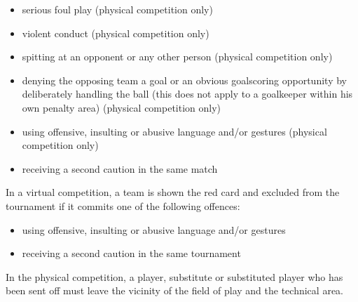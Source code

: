 \begin{itemize}
\item serious foul play (physical competition only)
\item violent conduct (physical competition only)
\item spitting at an opponent or any other person (physical competition only)
\item denying the opposing team a goal or an obvious goalscoring opportunity by deliberately handling the ball (this does not apply to a goalkeeper within his own penalty area) (physical competition only)
\item using offensive, insulting or abusive language and/or gestures (physical competition only)
\item receiving a second caution in the same match
\end{itemize}

\bigskip

In a virtual competition, a team is shown the red card and excluded from the tournament if it commits one of the following offences:

\begin{itemize}
\item using offensive, insulting or abusive language and/or gestures
\item receiving a second caution in the same tournament
\end{itemize}

\bigskip

In the physical competition, a player, substitute or substituted player who has been sent off must leave the vicinity of the field of play and the technical area.
